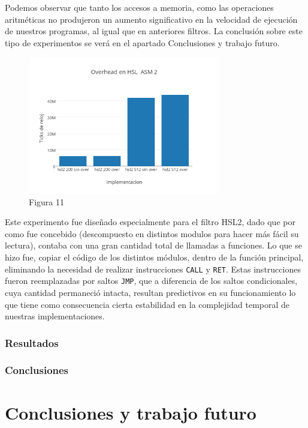 \documentclass[a4paper]{article}
\begin{document}
Podemos observar que tanto los accesos a memoria, como las operaciones aritméticas no produjeron un aumento significativo en la velocidad de ejecución de nuestros programas, al igual que en anteriores filtros. La conclusión sobre este tipo de experimentos se verá en el apartado Conclusiones y trabajo futuro.

\begin{figure}[h]
  \centering
    \includegraphics[width=0.75\textwidth]{imagenes/OverheadEnHSLASM2.png}
  \caption{Figura 11}
  \label{fig:graficohsl5}
\end{figure}
 \FloatBarrier

Este experimento fue diseñado especialmente para el filtro HSL2, dado que por como fue concebido (descompuesto en distintos modulos para hacer más fácil su lectura), contaba con una gran cantidad total de llamadas a funciones. Lo que se hizo fue, copiar el código de los distintos módulos, dentro de la función principal, eliminando la necesidad de realizar instrucciones {\tt CALL} y {\tt RET}. Estas instrucciones fueron reemplazadas por saltos {\tt JMP}, que a diferencia de los saltos condicionales, cuya cantidad permaneció intacta, resultan predictivos en su funcionamiento lo que tiene como consecuencia cierta estabilidad en la complejidad temporal de nuestras implementaciones.

\subsubsection{Resultados}

\subsubsection{Conclusiones}


\newpage
\section{Conclusiones y trabajo futuro}
\end{document}
